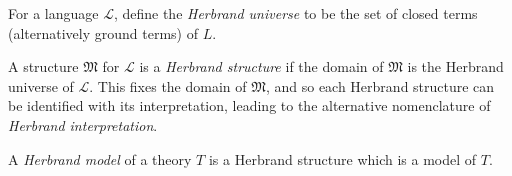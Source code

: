\documentclass[12pt]{article}
\begin{document}
For a language $\mathcal{L}$, define the \emph{Herbrand universe} to be the set of closed terms (alternatively ground terms) of $L$.  

A structure $\mathfrak{M}$ for $\mathcal{L}$ is a \emph{Herbrand structure} if the domain of $\mathfrak{M}$ is the Herbrand universe of $\mathcal{L}$. This fixes the domain of $\mathfrak{M}$, and so each Herbrand structure can be identified with its interpretation, leading to the alternative nomenclature of \emph{Herbrand interpretation}.

A \emph{Herbrand model} of a theory $T$ is a Herbrand structure which is a model of $T$.
\end{document}
